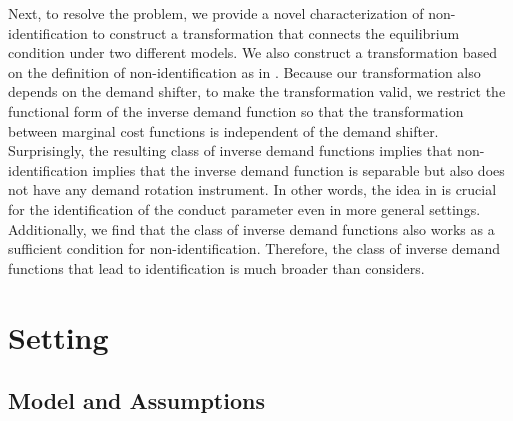 \documentclass[11pt, a4paper]{article}
\theoremstyle{remark}
\begin{document}
Next, to resolve the problem, we provide a novel characterization of non-identification to construct a transformation that connects the equilibrium condition under two different models.
We also construct a transformation based on the definition of non-identification as in \citet{lau1982identifying}.
Because our transformation also depends on the demand shifter, to make the transformation valid, we restrict the functional form of the inverse demand function so that the transformation between marginal cost functions is independent of the demand shifter.
Surprisingly, the resulting class of inverse demand functions implies that non-identification implies that the inverse demand function is separable but also does not have any demand rotation instrument.
In other words, the idea in \citet{bresnahan1982oligopoly} is crucial for the identification of the conduct parameter even in more general settings.
Additionally, we find that the class of inverse demand functions also works as a sufficient condition for non-identification.
Therefore, the class of inverse demand functions that lead to identification is much broader than \citet{lau1982identifying} considers.






\section{Setting}\label{sec:setting}

\subsection{Model and Assumptions}
\end{document}
